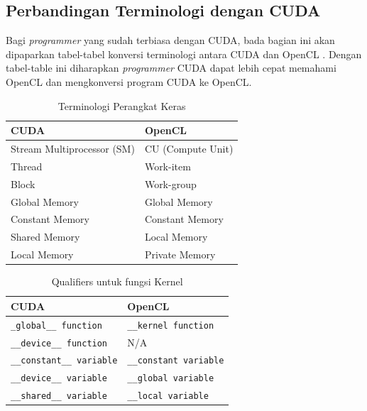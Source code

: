 \subsection{Perbandingan Terminologi dengan CUDA}

Bagi \textit{programmer} yang sudah terbiasa dengan CUDA, bada bagian ini akan dipaparkan tabel-tabel konversi terminologi antara CUDA dan OpenCL \cite{opencl.cuda.porting}. Dengan tabel-table ini diharapkan \textit{programmer} CUDA dapat lebih cepat memahami OpenCL dan mengkonversi program CUDA ke OpenCL. 

\begin{table}
	\centering
	\caption{Terminologi Perangkat Keras}
	\label{tab:terminologi_perangkat_keras}
	\begin{tabular}{|C{6cm}|C{6cm}|}
		 \hline \rule[-2ex]{0pt}{5.5ex} CUDA & OpenCL \\ 
		\hline \rule[-2ex]{0pt}{5.5ex} Stream Multiprocessor (SM) & CU (Compute Unit) \\ 
		\hline \rule[-2ex]{0pt}{5.5ex} Thread & Work-item \\ 
		\hline \rule[-2ex]{0pt}{5.5ex} Block & Work-group \\ 
		\hline \rule[-2ex]{0pt}{5.5ex} Global Memory & Global Memory \\ 
		\hline \rule[-2ex]{0pt}{5.5ex} Constant Memory & Constant Memory \\ 
		\hline \rule[-2ex]{0pt}{5.5ex} Shared Memory & Local Memory \\ 
		\hline \rule[-2ex]{0pt}{5.5ex} Local Memory & Private Memory \\ 
		\hline 
	\end{tabular} 
\end{table}

\begin{table}
	\centering
	\caption{Qualifiers untuk fungsi Kernel}
	\label{tab:qualifiers_untuk_fungsi_kernel}
	\begin{tabular}{|C{6cm}|C{6cm}|}
		 \hline \rule[-2ex]{0pt}{5.5ex} CUDA & OpenCL \\ 
		\hline \rule[-2ex]{0pt}{5.5ex} \verb|_global__ function|​ & \verb|__kernel function| \\ 
		\hline \rule[-2ex]{0pt}{5.5ex} \verb|__device__ function| & N/A \\ 
		\hline \rule[-2ex]{0pt}{5.5ex} \verb|__constant__ variable|​ & \verb|__constant variable| \\ 
		\hline \rule[-2ex]{0pt}{5.5ex} \verb|__device__ variable| & \verb|__global variable| \\ 
		\hline \rule[-2ex]{0pt}{5.5ex} \verb|__shared__ variable| & \verb|__local variable| \\ 
		\hline 
	\end{tabular} 
\end{table}



